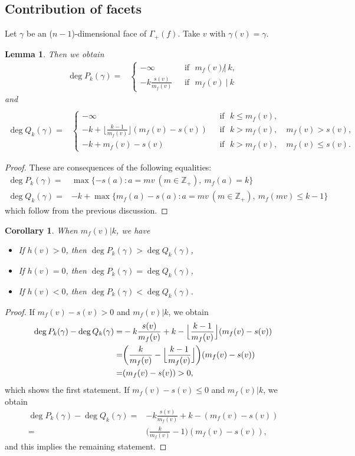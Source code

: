 \documentclass[12pt,a4paper,leqno]{amsart}
\newtheorem{cor}[thm]{Corollary}
\newtheorem{lem}[thm]{Lemma}
\theoremstyle{definition}
\begin{document}
\subsection{Contribution of facets}
Let $\gamma$ be an ($n-1$)-dimensional face of $\Gamma_+(f)$. 
Take $v$ with $\gamma(v)=\gamma$. 
\begin{lem}
Then we obtain 
\begin{align*}
\deg P_k(\gamma)=&
\begin{cases}
-\infty&\textrm{~~if~~}m_f(v)\not|\ k,\\
-k\frac{s(v)}{m_f(v)}&\textrm{~~if~~}m_f(v)\ |\ k
\end{cases}
\end{align*}
and
\begin{align*}
\\
\deg Q_k(\gamma)=&
\begin{cases}
-\infty&\textrm{~~if~~}k\le m_f(v),\\
-k+\bigl\lfloor\frac{k-1}{m_f(v)}\bigr\rfloor (m_f(v)-s(v))&\textrm{~~if~~} k>m_f(v),\quad m_f(v)>s(v),\\
-k+m_f(v)-s(v)&\textrm{~~if~~} k>m_f(v),\quad m_f(v)\le s(v).
\end{cases}
\end{align*}
\end{lem}
\begin{proof}
These are consequences of the following equalities: 
\begin{align*}
\deg P_k(\gamma)=&\max\{-s(a):a=mv\ (m\in {\mathbb{Z}}_+),\ m_f(a)=k\}\\
\deg Q_k(\gamma)=&-k+\max\{m_f(a)-s(a):a=mv\ (m\in{\mathbb{Z}}_+), \ m_f(mv)\le k-1\}\end{align*}
which follow from the previous discussion.  
\end{proof}
\begin{cor}
When $m_f(v)|k$, we have 
\begin{itemize}
\item If $h(v)>0$, then $\deg P_k(\gamma)>\deg Q_k(\gamma)$, 
\item If $h(v)=0$, then $\deg P_k(\gamma)=\deg Q_k(\gamma)$, 
\item If $h(v)<0$, then $\deg P_k(\gamma)<\deg Q_k(\gamma)$. 
\end{itemize}
\end{cor}
\begin{proof}
If $m_f(v)-s(v)>0$ and $m_f(v)|k$, we obtain 
\begin{align*}
\deg P_k(\gamma)-\deg Q_k(\gamma)
=&
-k\frac{s(v)}{m_f(v)}+k-
\Bigl\lfloor\frac{k-1}{m_f(v)}\Bigr\rfloor(m_f(v)-s(v))
\\
=&
\biggl(\frac{k}{m_f(v)}-\Bigl\lfloor\frac{k-1}{m_f(v)}\Bigr\rfloor\biggr)(m_f(v)-s(v))
\\
=&
(m_f(v)-s(v))>0,
\end{align*}
which shows the first statement. 
If $m_f(v)-s(v)\le0$ and $m_f(v)|k$, we obtain 
\begin{align*}
\deg P_k(\gamma)-\deg Q_k(\gamma)
=&
-k\frac{s(v)}{m_f(v)}+k-(m_f(v)-s(v))
\\
=&
\biggl(\frac{k}{m_f(v)}-1\biggr)(m_f(v)-s(v)),
\end{align*}
and this implies the remaining statement.
\end{proof}
\end{document}
